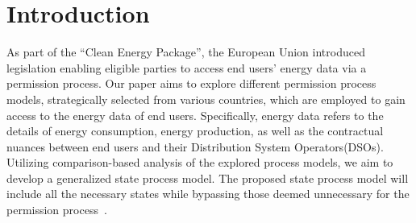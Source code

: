 \section{Introduction}\label{sec:introduction}
As part of the ``Clean Energy Package'', the European Union introduced legislation enabling eligible parties to access end users' energy data via a permission process.
Our paper aims to explore different permission process models, strategically selected from various countries, which are employed to gain access to the energy data of end users.
Specifically, energy data refers to the details of energy consumption, energy production, as well as the contractual nuances between end users and their Distribution System Operators(DSOs).
Utilizing comparison-based analysis of the explored process models, we aim to develop a generalized state process model.
The proposed state process model will include all the necessary states while bypassing those deemed unnecessary for the permission process~\cite{clean-energy}.
